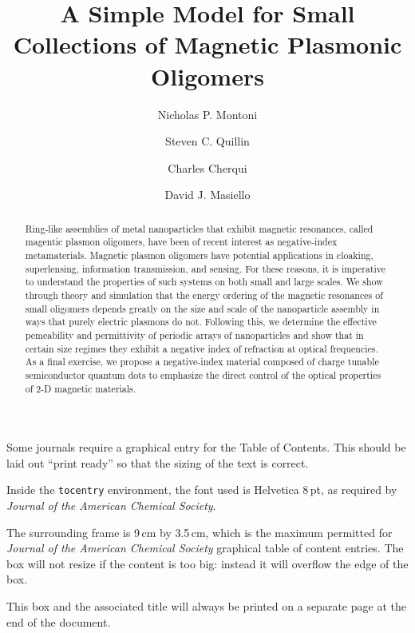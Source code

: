 \documentclass[journal=apchd5,manuscript=article]{achemso}
\author{Nicholas P. Montoni}
\author{Steven C. Quillin}
\author{Charles Cherqui}
\affiliation[Department of Chemistry, University of Washington]
{Department of Chemistry, University of Washington, Seattle, WA 98195}
\author{David J. Masiello}
\affiliation[Department of Chemistry, University of Washington]
{Department of Chemistry, University of Washington, Seattle, WA 98195}
\title[]
    {A Simple Model for Small Collections of Magnetic Plasmonic Oligomers}
\begin{document}
\begin{tocentry}

Some journals require a graphical entry for the Table of Contents.
This should be laid out ``print ready'' so that the sizing of the
text is correct.

Inside the \texttt{tocentry} environment, the font used is Helvetica
8\,pt, as required by \emph{Journal of the American Chemical
Society}.

The surrounding frame is 9\,cm by 3.5\,cm, which is the maximum
permitted for  \emph{Journal of the American Chemical Society}
graphical table of content entries. The box will not resize if the
content is too big: instead it will overflow the edge of the box.

This box and the associated title will always be printed on a
separate page at the end of the document.

\end{tocentry}

\begin{abstract}
Ring-like assemblies of metal nanoparticles that exhibit magnetic resonances, called magentic plasmon oligomers, have been of recent interest as negative-index metamaterials. Magnetic plasmon oligomers have potential applications in cloaking, superlensing, information transmission, and sensing. For these reasons, it is imperative to understand the properties of such systems on both small and large scales. We show through theory and simulation that the energy ordering of the magnetic resonances of small oligomers depends greatly on the size and scale of the nanoparticle assembly in ways that purely electric plasmons do not. Following this, we determine the effective pemeability and permittivity of periodic arrays of nanoparticles and show that in certain size regimes they exhibit a negative index of refraction at optical frequencies. As a final exercise, we propose a negative-index material composed of charge tunable semiconductor quantum dots to emphasize the direct control of the optical properties of 2-D magnetic materials.
\end{abstract}
\end{document}

